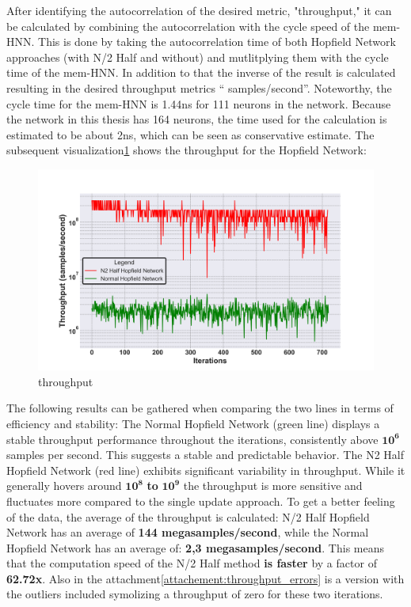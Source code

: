 After identifying the autocorrelation of the desired metric, "throughput," it can be calculated by combining the autocorrelation with the cycle speed of the \ac{mem-HNN}.
This is done by taking the autocorrelation time of both Hopfield Network approaches (with N/2 Half and without) and mutlitplying them with the cycle time of the \ac{mem-HNN}.
In addition to that the inverse of the result is calculated resulting in the desired throughput metrics `` samples/second''.
Noteworthy, the cycle time for the \ac{mem-HNN} is 1.44ns for 111 neurons in the network. 
Because the network in this thesis has 164 neurons, the time used for the calculation is estimated to be about 2ns, which can be seen as conservative estimate.
The subsequent visualization\ref{Throughput comparison} shows the throughput for the Hopfield Network:
\begin{figure}[H]
    \centering
    \includegraphics[width=0.8\linewidth]{graphics/Visualisierungen_throughput_log_2.png}
    \caption{throughput}
    \label{Throughput comparison}
\end{figure}
The following results can be gathered when comparing the two lines in terms of efficiency and stability:
The Normal Hopfield Network (green line) displays a stable throughput performance throughout the iterations, consistently above \(\mathbf{10^6}\)
samples per second. This suggests a stable and predictable behavior.
The N2 Half Hopfield Network (red line) exhibits significant variability in throughput. 
While it generally hovers around \(\mathbf{10^8}\) \textbf{to} \(\mathbf{10^9}\) the throughput is more sensitive and fluctuates more compared to the single update approach. 
To get a better feeling of the data, the average of the throughput is calculated: N/2 Half Hopfield Network has
an average of \textbf{144 megasamples/second}, while the
Normal Hopfield Network has an average of: \textbf{2,3 megasamples/second}. 
This means that the computation speed of the N/2 Half method \textbf{is faster} by a factor of \textbf{62.72x}.
Also in the attachment\ref{attachement:throughput_errors} is a version with the outliers included symolizing a throughput of zero for these two iterations.

